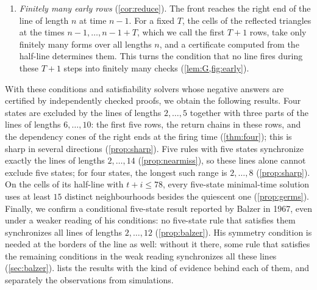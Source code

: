 \begin{enumerate}[(1)]
  periodic blocks, separated by signals of rational speeds, whose lengths grow
  linearly. Other kinds of regular
  behaviour, and periodic regions away from the left border, are not excluded.
  The reason is that the cells near the left border are fired by a finite
  automaton that reads the half-line along the cells with $t+i=2n-3$ and
  $t+i=2n-2$, and a long periodic input would make it fire too early
  (\cref{lem:left,fig:leftproof}). For example, no five-state rule whose
  half-line agrees with that of $\delta_{12}$ on the cells with $t+i\le78$
  synchronizes the line of length $518$ in minimal time
  (\cref{cor:germ12,fig:delta12}).
\item \emph{Finitely many early rows} (\cref{cor:reduce}). The front reaches
  the right end of the line of length $n$ at time $n-1$. For a fixed $T$, the
  cells of the reflected triangles at the times $n-1,\dots,n-1+T$, which we call
  the first $T+1$ rows, take only finitely many forms over all lengths $n$, and a
  certificate computed from the half-line determines them. This turns the
  condition that no line fires during these $T+1$ steps into finitely many
  checks (\cref{lem:G,fig:early}).
\end{enumerate}
With these conditions and satisfiability solvers whose negative answers are
certified by independently checked proofs, we obtain the following results.
Four states are excluded by the lines of lengths $2,\dots,5$ together with
three parts of the lines of lengths $6,\dots,10$: the first five rows, the
return chains in these rows, and the dependency cones of the right ends at the
firing time (\cref{thm:four}); this is sharp in several directions
(\cref{prop:sharp}). Five rules with five states synchronize exactly
the lines of lengths $2,\dots,14$ (\cref{prop:nearmiss}), so these lines alone
cannot exclude five states; for four states, the longest such range is $2,\dots,8$
(\cref{prop:sharp}). On
the cells of its half-line with $t+i\le78$, every five-state minimal-time
solution uses at least $15$ distinct neighbourhoods besides the quiescent one
(\cref{prop:germs}). Finally, we confirm a conditional five-state result
reported by Balzer in 1967, even under a weaker reading of his conditions: no
five-state rule that satisfies them synchronizes all lines of lengths
$2,\dots,12$ (\cref{prop:balzer}). His symmetry condition is needed at the
borders of the line as well: without it there, some rule that satisfies the
remaining conditions in the weak reading synchronizes all these lines
(\cref{sec:balzer}).
 lists the results with the kind of evidence behind each of
them, and separately the observations from simulations.


